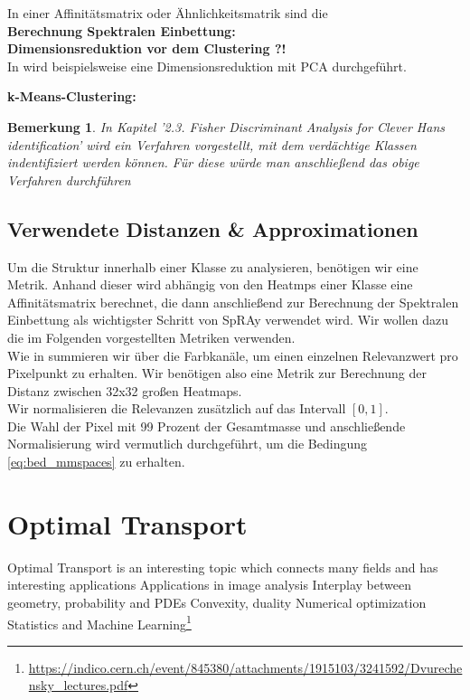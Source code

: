 \documentclass[11pt,a4paper]{article}
\newtheorem{remark}[theorem]{Bemerkung}
\numberwithin{equation}{section}
\begin{document}
	In einer Affinitätsmatrix oder Ähnlichkeitsmatrik sind die \\
	
	\noindent \textbf{Berechnung Spektralen Einbettung:}\\
	
	\noindent \textbf{Dimensionsreduktion vor dem Clustering ?!}\\
	
	In \cite{AC} wird beispielsweise eine Dimensionsreduktion mit PCA durchgeführt.
	
	\noindent \textbf{k-Means-Clustering:}\\
	\begin{remark}
		In \cite{imagenet_unhansed_v1} Kapitel '2.3. Fisher Discriminant Analysis for Clever Hans
		identification' wird ein Verfahren vorgestellt, mit dem verdächtige Klassen indentifiziert werden können. Für diese würde man anschließend das obige Verfahren durchführen
	\end{remark}
	\subsection{Verwendete Distanzen \& Approximationen}
	Um die Struktur innerhalb einer Klasse zu analysieren, benötigen wir eine Metrik.
	Anhand dieser wird abhängig von den Heatmps einer Klasse eine Affinitätsmatrix berechnet, die dann anschließend zur Berechnung der Spektralen Einbettung als wichtigster Schritt von SpRAy verwendet wird. Wir wollen dazu die im Folgenden vorgestellten Metriken verwenden.\\
	Wie in \cite{imagenet_unhansed_v1} summieren wir über die Farbkanäle, um einen einzelnen Relevanzwert pro Pixelpunkt zu erhalten. Wir benötigen also eine Metrik zur Berechnung der Distanz zwischen 32x32 großen Heatmaps.\\
	Wir normalisieren die Relevanzen zusätzlich auf das Intervall $[0,1]$.\\
	Die Wahl der Pixel mit 99 Prozent der Gesamtmasse und anschließende Normalisierung wird vermutlich durchgeführt, um die Bedingung \autoref{eq:bed_mmspaces} zu erhalten.
	\section{Optimal Transport}
	
	Optimal Transport is an interesting topic which connects many fields and has
	interesting applications
	Applications in image analysis
	Interplay between geometry, probability and PDEs
	Convexity, duality
	Numerical optimization
	Statistics and Machine Learning\footnote{\url{https://indico.cern.ch/event/845380/attachments/1915103/3241592/Dvurechensky_lectures.pdf}}
	
\end{document}
